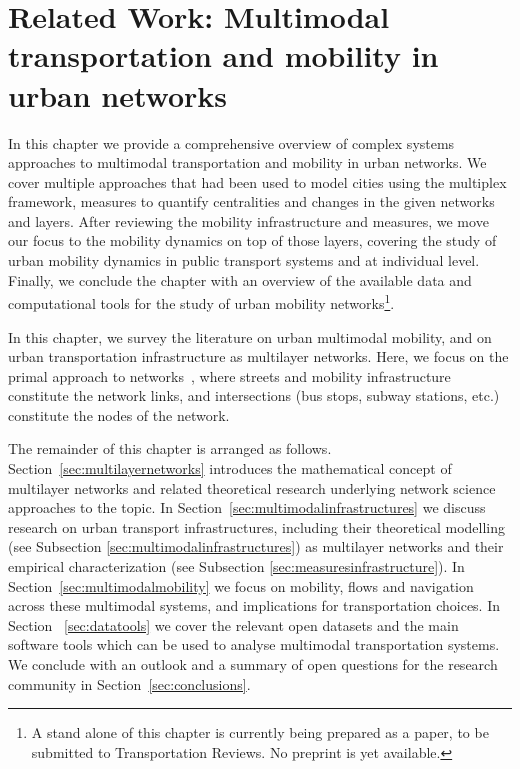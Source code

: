 \chapter{Related Work: Multimodal transportation and mobility in urban networks}\label{ch:litReview}

In this chapter we provide a comprehensive overview of complex systems approaches to multimodal transportation and mobility in urban networks. We cover multiple approaches that had been used to model cities using the multiplex framework, measures to quantify centralities and changes in the given networks and layers. After reviewing the mobility infrastructure and measures, we move our focus to the mobility dynamics on top of those layers, covering the study of urban mobility dynamics in public transport systems and at individual level. Finally, we conclude the chapter with an overview of the available data and computational tools for the study of urban mobility networks\footnote{A stand alone of this chapter is currently being prepared as a paper, to be submitted to Transportation Reviews. No preprint is yet available.}.
\pagebreak

In this chapter, we survey the literature on urban multimodal mobility, and on urban transportation infrastructure as multilayer networks. Here, we focus on the primal approach to networks~\cite{porta2006primal}, where streets and mobility infrastructure constitute the network links, and intersections (bus stops, subway stations, etc.) constitute the nodes of the network.

The remainder of this chapter is arranged as follows. Section~\ref{sec:multilayernetworks} introduces the mathematical concept of multilayer networks and related theoretical research underlying network science approaches to the topic. In Section~\ref{sec:multimodalinfrastructures} we discuss research on urban transport infrastructures, including their theoretical modelling (see Subsection \ref{sec:multimodalinfrastructures}) as multilayer networks and their empirical characterization (see Subsection \ref{sec:measuresinfrastructure}). In Section~\ref{sec:multimodalmobility} we focus on mobility, flows and navigation across these multimodal systems, and implications for transportation choices. In Section ~\ref{sec:datatools} we cover the relevant open datasets and the main software tools which can be used to analyse multimodal transportation systems. We conclude with an outlook and a summary of open questions for the research community in Section~\ref{sec:conclusions}. 

